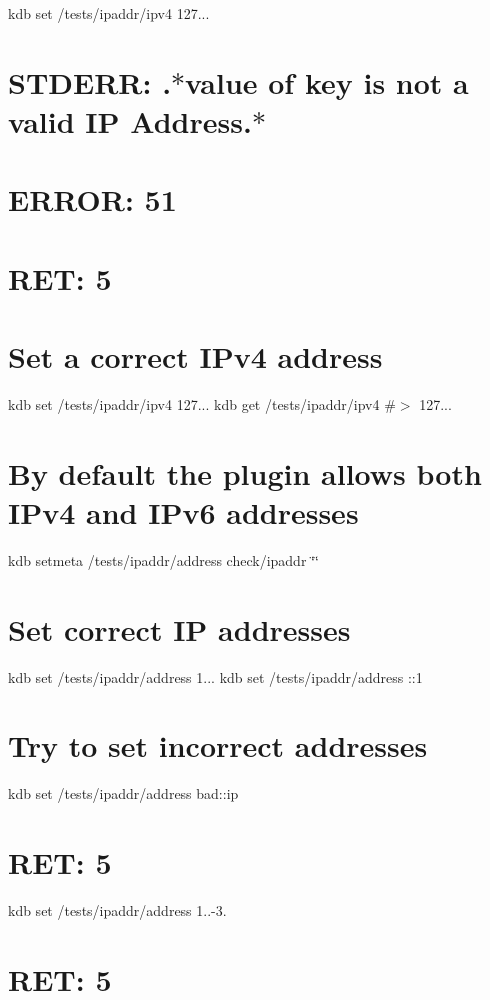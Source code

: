 kdb set /tests/ipaddr/ipv4 127... \section*{S\+T\+D\+E\+RR\+: .$\ast$value of key is not a valid IP Address.$\ast$}

\section*{E\+R\+R\+OR\+: 51}

\section*{R\+ET\+: 5}

\section*{Set a correct I\+Pv4 address}

kdb set /tests/ipaddr/ipv4 127... kdb get /tests/ipaddr/ipv4 \#$>$ 127...

\section*{By default the plugin allows both I\+Pv4 and I\+Pv6 addresses}

kdb setmeta /tests/ipaddr/address check/ipaddr \char`\"{}\char`\"{}

\section*{Set correct IP addresses}

kdb set /tests/ipaddr/address 1... kdb set /tests/ipaddr/address \+:\+:1

\section*{Try to set incorrect addresses}

kdb set /tests/ipaddr/address bad\+::ip \section*{R\+ET\+: 5}

kdb set /tests/ipaddr/address 1..-\/3. \section*{R\+ET\+: 5}

